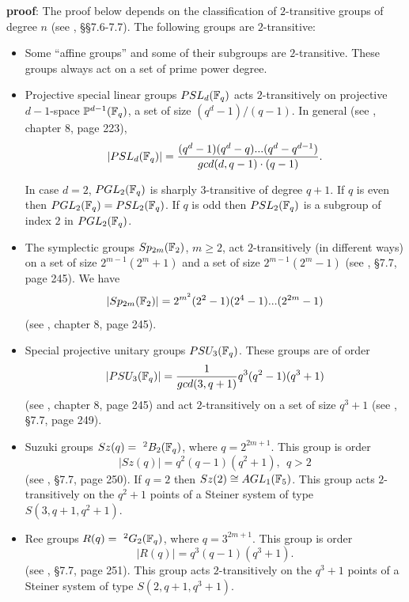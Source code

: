 {\bf proof}: The proof below depends on the classification of 
$2$-transitive groups of degree $n$ (see \cite{DM}, 
\S\S 7.6-7.7). The following groups are $2$-transitive:
\begin{itemize}
\item
Some ``affine groups'' and some of their subgroups
are $2$-transitive. These groups
always act on a set of prime power degree.
\item
Projective special linear groups $PSL_d({{\Bbb F}}_q)$ 
acts $2$-transitively on projective $d-1$-space 
${{\Bbb P}}^{d-1}({{\Bbb F}}_q)$, a set of size
$(q^d-1)/(q-1)$. In general (see \cite{R},
chapter 8, page 223),
\[
|PSL_d({{\Bbb F}}_q)|={(q^d-1)(q^d-q)...(q^d-q^{d-1})
\over {gcd(d,q-1)\cdot (q-1)}}.
\]

In case $d=2$, $PGL_2({{\Bbb F}}_q)$ is sharply $3$-transitive
of degree $q+1$. If $q$ is even then 
$PGL_2({{\Bbb F}}_q)=PSL_2({{\Bbb F}}_q)$. If $q$ is odd
then $PSL_2({{\Bbb F}}_q)$ is a subgroup of index $2$ in
$PGL_2({{\Bbb F}}_q)$.

\item
The symplectic groups $Sp_{2m}({{\Bbb F}}_2)$, $m\geq 2$,
act $2$-transitively (in different ways) on a set of size 
$2^{m-1}(2^m+1)$ and a set of size $2^{m-1}(2^m-1)$
(see \cite{DM}, \S 7.7, page 245).
We have 
\[
|Sp_{2m}({{\Bbb F}}_2)|=2^{m^2}(2^2-1)(2^4-1)...(2^{2m } -1)
\]
(see \cite{R}, chapter 8, page 245).

\item
Special projective unitary groups $PSU_3({{\Bbb F}}_q)$.
These groups are of order
\[
|PSU_3({{\Bbb F}}_q)|=
{1\over gcd(3,q+1)}q^3(q^2-1)(q^3+1)
\]
(see \cite{R}, chapter 8, page 245)
and act $2$-transitively on a set of size $q^3+1$
(see \cite{DM}, \S 7.7, page 249).

\item
Suzuki groups $Sz(q)=\ ^2B_2({{\Bbb F}}_q)$,
where $q=2^{2m+1}$. This group is order
\[
|Sz(q)|=q^2(q-1)(q^2+1), \ \ q>2
\]
(see \cite{DM}, \S 7.7, page 250).
If $q=2$ then $Sz(2)\cong AGL_1({{\Bbb F}}_5)$.
This group acts $2$-transitively on the
$q^2+1$ points of a Steiner system of type $S(3,q+1,q^2+1)$.

\item
Ree groups $R(q)=\ ^2G_2({{\Bbb F}}_q)$,
where $q=3^{2m+1}$. This group is order
\[
|R(q)|=q^3(q-1)(q^3+1).
\]
(see \cite{DM}, \S 7.7, page 251).
This group acts $2$-transitively on the
$q^3+1$ points of a Steiner system of type $S(2,q+1,q^3+1)$.


\end{itemize}
